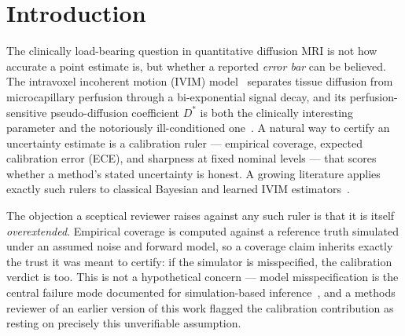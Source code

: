 \documentclass[11pt]{article}
\newcommand{\Ds}{D^{*}}
\begin{document}
\begin{abstract}
\textbf{Conclusion.} A large, reproducible fraction of conventional NLLS IVIM fits
rail to a parameter bound on open human-abdominal data. Because the statistic is
read off the optimizer without any calibration-trust assumption, it is immune to
the overextension objection; the calibration ruler remains useful but scoped.
\end{abstract}

\section{Introduction}

The clinically load-bearing question in quantitative diffusion MRI is not how
accurate a point estimate is, but whether a reported \emph{error bar} can be
believed. The intravoxel incoherent motion (IVIM) model~\cite{lebihan1988}
separates tissue diffusion from microcapillary perfusion through a
bi-exponential signal decay, and its perfusion-sensitive pseudo-diffusion
coefficient $\Ds$ is both the clinically interesting parameter and the
notoriously ill-conditioned one~\cite{koh2011,lemke2011}. A natural way to certify
an uncertainty estimate is a calibration ruler --- empirical coverage, expected
calibration error (ECE), and sharpness at fixed nominal levels --- that scores
whether a method's stated uncertainty is honest. A growing literature applies
exactly such rulers to classical Bayesian and learned IVIM
estimators~\cite{while2017,orton2014,barbieri2020,kaandorp2021,casali2026}.

The objection a sceptical reviewer raises against any such ruler is that it is
itself \emph{overextended}. Empirical coverage is computed against a reference
truth simulated under an assumed noise and forward model, so a coverage claim
inherits exactly the trust it was meant to certify: if the simulator is
misspecified, the calibration verdict is too. This is not a hypothetical concern
--- model misspecification is the central failure mode documented for
simulation-based inference~\cite{hermans2022,cannon2022,frazier2020}, and a
methods reviewer of an earlier version of this work flagged the calibration
contribution as resting on precisely this unverifiable assumption.
\end{document}
